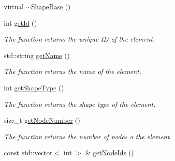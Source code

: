 \begin{DoxyCompactItemize}
\item 
virtual \hyperlink{classShapeBase_af919db3ff5e6a6d4a137cf4625189c23}{$\sim$\+Shape\+Base} ()
\item 
\hypertarget{classShapeBase_ab55ac0089ea8e37649b0d85409c008ac}{}int \hyperlink{classShapeBase_ab55ac0089ea8e37649b0d85409c008ac}{get\+Id} ()\label{classShapeBase_ab55ac0089ea8e37649b0d85409c008ac}

\begin{DoxyCompactList}\small\item\em The function returns the unique I\+D of the element. \end{DoxyCompactList}\item 
\hypertarget{classShapeBase_a0adf2bb9b59c68adc9dfdab8b9a67a5a}{}std\+::string \hyperlink{classShapeBase_a0adf2bb9b59c68adc9dfdab8b9a67a5a}{get\+Name} ()\label{classShapeBase_a0adf2bb9b59c68adc9dfdab8b9a67a5a}

\begin{DoxyCompactList}\small\item\em The function returns the name of the element. \end{DoxyCompactList}\item 
\hypertarget{classShapeBase_a7ae6deee4256eb19c6e99b52a40847cb}{}int \hyperlink{classShapeBase_a7ae6deee4256eb19c6e99b52a40847cb}{get\+Shape\+Type} ()\label{classShapeBase_a7ae6deee4256eb19c6e99b52a40847cb}

\begin{DoxyCompactList}\small\item\em The function returns the shape type of the element. \end{DoxyCompactList}\item 
\hypertarget{classShapeBase_a578a8062720c07fc8e1ad526422c96b8}{}size\+\_\+t \hyperlink{classShapeBase_a578a8062720c07fc8e1ad526422c96b8}{get\+Node\+Number} ()\label{classShapeBase_a578a8062720c07fc8e1ad526422c96b8}

\begin{DoxyCompactList}\small\item\em The function returns the number of nodes o the element. \end{DoxyCompactList}\item 
\hypertarget{classShapeBase_ab0f803aa2f7587251d746706cc478b71}{}const std\+::vector$<$ int $>$ \& \hyperlink{classShapeBase_ab0f803aa2f7587251d746706cc478b71}{get\+Node\+Ids} ()\label{classShapeBase_ab0f803aa2f7587251d746706cc478b71}


\end{DoxyCompactItemize}

